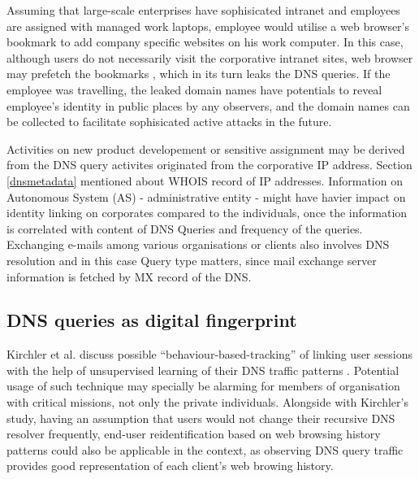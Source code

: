 Assuming that large-scale enterprises have sophisicated intranet and employees are assigned with managed work laptops, employee would utilise a web browser's bookmark to add company specific websites on his work computer. In this case, although users do not necessarily visit the corporative intranet sites, web browser may prefetch the bookmarks \cite{firefox-autocomplete-url, chrome-dns-prefectching}, which in its turn leaks the DNS queries. If the employee was travelling, the leaked domain names have potentials to reveal employee's identity in public places by any observers, and the domain names can be collected to facilitate sophisicated active attacks in the future.

Activities on new product developement or sensitive assignment may be derived from the DNS query activites originated from the corporative IP address. Section \ref{dnsmetadata} mentioned about WHOIS record of IP addresses. Information on Autonomous System (AS) - administrative entity - might have havier impact on identity linking on corporates compared to the individuals, once the information is correlated with content of DNS Queries and frequency of the queries. Exchanging e-mails among various organisations or clients also involves DNS resolution and in this case Query type matters, since mail exchange server information is fetched by MX record of the DNS.

\subsection{DNS queries as digital fingerprint}
Kirchler et al. discuss possible ``behaviour-based-tracking'' of linking user sessions with the help of unsupervised learning of their DNS traffic patterns \cite{kirchler2016tracked}. Potential usage of such technique may specially be alarming for members of organisation with critical missions, not only the private individuals.
Alongside with Kirchler's study, having an assumption that users would not change their recursive DNS resolver frequently, end-user reidentification based on web browsing history patterns \cite{olejnik2012johnny} could also be applicable in the context, as observing DNS query traffic provides good representation of each client's web browing history.